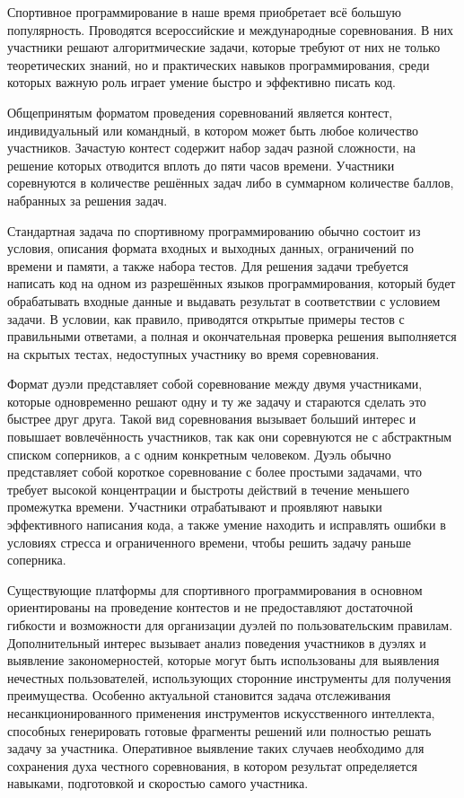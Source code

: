 
Спортивное программирование в наше время приобретает всё большую популярность.
Проводятся всероссийские и международные соревнования.
В них участники решают алгоритмические задачи, которые требуют от них не только теоретических знаний,
но и практических навыков программирования, среди которых важную роль играет умение быстро и эффективно писать код.

Общепринятым форматом проведения соревнований является контест, индивидуальный или командный,
в котором может быть любое количество участников.
Зачастую контест содержит набор задач разной сложности, на решение которых отводится вплоть до пяти часов времени.
Участники соревнуются в количестве решённых задач либо в суммарном количестве баллов, набранных за решения задач.

Стандартная задача по спортивному программированию обычно состоит из условия, описания формата входных и выходных данных,
ограничений по времени и памяти, а также набора тестов.
Для решения задачи требуется написать код на одном из разрешённых языков программирования,
который будет обрабатывать входные данные и выдавать результат в соответствии с условием задачи.
В условии, как правило, приводятся открытые примеры тестов с правильными ответами,
а полная и окончательная проверка решения выполняется на скрытых тестах, недоступных участнику во время соревнования.

Формат дуэли представляет собой соревнование между двумя участниками,
которые одновременно решают одну и ту же задачу и стараются сделать это быстрее друг друга.
Такой вид соревнования вызывает больший интерес и повышает вовлечённость участников,
так как они соревнуются не с абстрактным списком соперников, а с одним конкретным человеком.
Дуэль обычно представляет собой короткое соревнование с более простыми задачами,
что требует высокой концентрации и быстроты действий в течение меньшего промежутка времени.
Участники отрабатывают и проявляют навыки эффективного написания кода,
а также умение находить и исправлять ошибки в условиях стресса и ограниченного времени, чтобы решить задачу раньше соперника.

Существующие платформы для спортивного программирования в основном ориентированы на проведение контестов
и не предоставляют достаточной гибкости и возможности для организации дуэлей по пользовательским правилам.
Дополнительный интерес вызывает анализ поведения участников в дуэлях и выявление закономерностей,
которые могут быть использованы для выявления нечестных пользователей,
использующих сторонние инструменты для получения преимущества.
Особенно актуальной становится задача отслеживания несанкционированного применения инструментов искусственного интеллекта,
способных генерировать готовые фрагменты решений или полностью решать задачу за участника.
Оперативное выявление таких случаев необходимо для сохранения духа честного соревнования,
в котором результат определяется навыками, подготовкой и скоростью самого участника.

